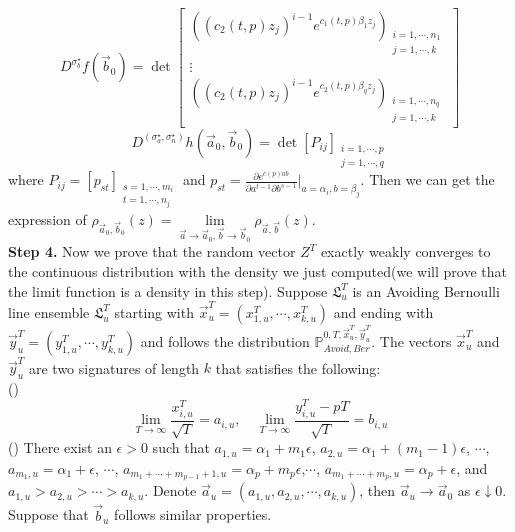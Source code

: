\documentclass[12pt]{article}
\begin{document}
\[ D^{\sigma_{b}^{\star}}f(\vec{b}_{0})= \det
	\left[ \begin{array}{ccc}
		((c_{2}(t,p)z_{j})^{i-1}e^{c_{1}(t,p)\beta_{1}z_{j}})_{\substack{i=1,\cdots,n_{1}\\j=1,\cdots,k}}\\
	\vdots\\
	((c_{2}(t,p)z_{j})^{i-1}e^{c_{2}(t,p)\beta_{q}z_{j}})_{\substack{i=1,\cdots, n_{q} \\j=1,\cdots,k}}
	\end{array}
	\right]
\]
\[
D^{(\sigma_{a}^{\star},\sigma_{n}^{\star})}h(\vec{a}_{0},\vec{b}_{0})= \det[P_{ij}]_{\substack{i=1,\cdots,p\\j=1,\cdots,q}}
\]
where $P_{ij}=[p_{st}]_{\substack{s=1,\cdots,m_{i}\\t=1,\cdots,n_{j}}}$ and $p_{st}=\frac{\partial e^{c(p)ab}}{\partial a^{t-1}\partial b^{s-1}}|_{a=\alpha_{i},b=\beta_{j}}$. Then we can get the expression of $\rho_{\vec{a}_{0},\vec{b}_{0}}(z)=\lim\limits_{\vec{a}\rightarrow\vec{a}_{0},\vec{b}\rightarrow\vec{b}_{0}}\rho_{\vec{a},\vec{b}}(z)$.\\
\textbf{Step 4. }Now we prove that the random vector $Z^{T}$ exactly weakly converges to the continuous distribution with the density we just computed(we will prove that the limit function is a density in this step). Suppose $\mathfrak{L}_{u}^{T}$ is an Avoiding Bernoulli line ensemble $\mathfrak{L}_{u}^{T}$ starting with $\vec{x}^{T}_{u}=(x_{1,u}^{T},\cdots,x_{k,u}^{T})$ and ending with $\vec{y}^{T}_{u}=(y_{1,u}^{T},\cdots,y_{k,u}^{T})$ and follows the distribution $\mathbb{P}_{Avoid,Ber}^{0,T,\vec{x}^{T}_{u},\vec{y}^{T}_{u}}$. The vectors $\vec{x}^{T}_{u}$ and $\vec{y}^{T}_{u}$ are two signatures of length $k$ that satisfies the following:\\
()$$\lim_{T\rightarrow\infty}\frac{x^{T}_{i,u}}{\sqrt{T}}=a_{i,u},\quad \lim_{T\rightarrow\infty}\frac{y^{T}_{i,u}-pT}{\sqrt{T}}=b_{i,u}$$
() There exist an $\epsilon>0$ such that $a_{1,u}=\alpha_{1}+m_{1}\epsilon$, $a_{2,u}=\alpha_{1}+(m_{1}-1)\epsilon$, $\cdots$, $a_{m_{1},u}=\alpha_{1}+\epsilon$, $\cdots$, $a_{m_{1}+\cdots+m_{p-1}+1,u}=\alpha_{p}+m_{p}\epsilon$,$\cdots$, $a_{m_{1}+\cdots+m_{p},u}=\alpha_{p}+\epsilon$, and $a_{1,u}>a_{2,u}>\cdots>a_{k,u}$. Denote $\vec{a}_{u}=(a_{1,u},a_{2,u},\cdots,a_{k,u})$, then $\vec{a}_{u}\rightarrow\vec{a}_{0}$ as $\epsilon\downarrow 0$. Suppose that $\vec{b}_{u}$ follows similar properties.\\
\end{document}
